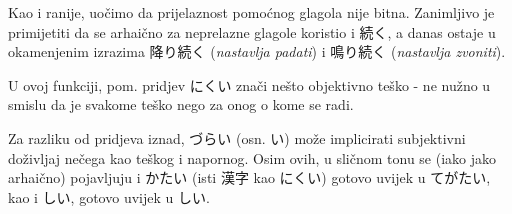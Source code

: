 	Kao i ranije, uočimo da prijelaznost pomoćnog glagola nije bitna. Zanimljivo je primijetiti da se arhaično za neprelazne glagole koristio i 続く, a danas ostaje u okamenjenim izrazima 降り続く (\textit{nastavlja padati}) i 鳴り続く (\textit{nastavlja zvoniti}).
	
	\begin{reibun}
	\end{reibun}
	
	\newpage
	
	\begin{reibun}
	\end{reibun}

	\begin{reibun}
	\end{reibun}

	U ovoj funkciji, pom. pridjev にくい znači nešto objektivno teško - ne nužno u smislu da je svakome teško nego za onog o kome se radi.
	
	\begin{reibun}
	\end{reibun}

	Za razliku od pridjeva iznad, づらい (osn. い) može implicirati subjektivni doživljaj nečega kao teškog i napornog. Osim ovih, u sličnom tonu se (iako jako arhaično) pojavljuju i かたい (isti 漢字 kao にくい) gotovo uvijek u てがたい, kao i しい, gotovo uvijek u しい.
	

